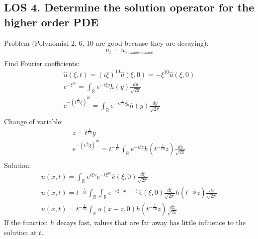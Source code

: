 \documentclass[12pt, a4paper]{article}
\begin{document}
\subsection*{LOS 4. Determine the solution operator for the higher order PDE}
Problem (Polynomial 2, 6, 10 are good because they are decaying):
\begin{gather*}
    u_t = u_{xxxxxxxxxx}\\
\end{gather*}
Find Fourier coefficients:
\begin{gather*}
    \hat{u}(\xi, t) = (i\xi)^{10} \hat{u}(\xi, 0) = -\xi^{10}\hat{u}(\xi, 0)\\
    e^{-\xi^{10}} = \int_\mathbb{R} e^{-i\xi y} h(y) \frac{dy}{\sqrt{2\pi}}\\
    e^{-{(t^{\frac{1}{10}}\xi)}^{10}} = \int_\mathbb{R} e^{-it^{\frac{1}{10}}\xi y} h(y) \frac{dy}{\sqrt{2\pi}}\\
\end{gather*}
Change of variable:
\begin{gather*}
    z = t^{\frac{1}{10}}y\\
    e^{-{(t^{\frac{1}{10}}\xi)}^{10}} = t^{-\frac{1}{10}} \int_\mathbb{R} e^{-i\xi z} h(t^{-\frac{1}{10}}z) \frac{dz}{\sqrt{2\pi}}\\
\end{gather*}
Solution:
\begin{gather*}
    u(x, t)= \int_\mathbb{R} e^{i\xi x} e^{-t\xi^{10}} \hat{e}(\xi, 0) \frac{d\xi}{\sqrt{2\pi}}\\
    u(x, t)= t^{-\frac{1}{10}} \int_\mathbb{R}\int_\mathbb{R} e^{-i\xi (x-z)} \hat{e}(\xi, 0)\frac{d\xi}{\sqrt{2\pi}} h(t^{-\frac{1}{10}}z) \frac{dz}{\sqrt{2\pi}}\\
    u(x, t)= t^{-\frac{1}{10}} \int_\mathbb{R}u(x-z, 0) h(t^{-\frac{1}{10}}z) \frac{dz}{\sqrt{2\pi}}
\end{gather*}
If the function $h$ decays fast, values that are far away has little influence to the solution at $t$.

\vspace{0.3em}
\end{document}
